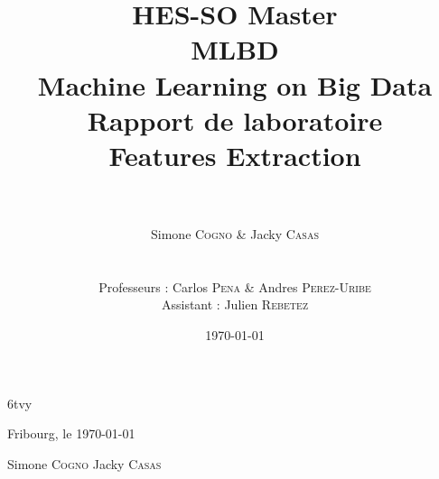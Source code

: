 6tvy\documentclass[a4paper, 12pt]{report}
\title{\huge{HES-SO Master} \\ \Huge{\textbf{\textsc{MLBD}}} \\
\LARGE{Machine Learning on Big Data} \\
\vspace{2cm} \huge{\textbf{Rapport de laboratoire}} \\ 
\huge{Features Extraction}}
\author{\\ \\ Simone \textsc{Cogno} \& Jacky \textsc{Casas} \\
\\ \\
Professeurs : Carlos \textsc{Pena} \& Andres \textsc{Perez-Uribe} \\
Assistant : Julien \textsc{Rebetez}}
\date{\today}
\begin{document}
\maketitle %
\newpage
\tableofcontents
\newpage

%


%
%


\vspace{3cm}
Fribourg, le \today

\vspace{1cm}

\hspace{2cm} Simone \textsc{Cogno} \hspace{4cm} Jacky \textsc{Casas}

\vspace{2cm}


%
\end{document}
